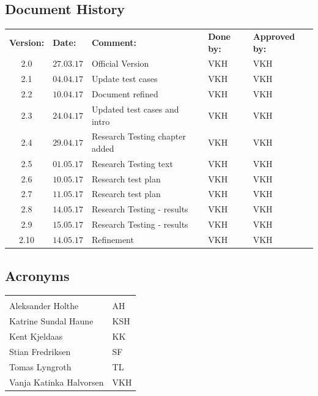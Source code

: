 \documentclass{article}
\begin{document}
\begin{center}
\section*{\textbf{Document History}}
\begin{tabular}{cllll}
\rowcolor{cadetgrey}
\textbf{Version:}    &\textbf{Date:} 	 &\textbf{Comment:}    &\textbf{Done by:}   &\textbf{Approved by:}  \\
2.0    & $27.03.17$    & Official Version & VKH & VKH \\
2.1    & $04.04.17$    & Update test cases & VKH & VKH \\
2.2    & $10.04.17$    & Document refined & VKH & VKH \\
2.3    & $24.04.17$    & Updated test cases and intro & VKH & VKH \\
2.4    & $29.04.17$    & Research Testing chapter added & VKH & VKH \\
2.5    & $01.05.17$    & Research Testing text & VKH & VKH \\
2.6    & $10.05.17$    & Research test plan & VKH & VKH \\
2.7    & $11.05.17$    & Research test plan & VKH & VKH \\
2.8    & $14.05.17$    & Research Testing - results & VKH & VKH \\
2.9    & $15.05.17$    & Research Testing - results & VKH & VKH \\
2.10    & $14.05.17$   & Refinement & VKH & VKH \\
\end{tabular}                                                                   
\end{center}
\vspace*{1 cm}

\begin{center}
\section*{\textbf{Acronyms}}
\begin{tabular}{ll}
\rowcolor{cadetgrey}
    &   \\
Aleksander Holthe      & AH     
 \\\rowcolor{gainsboro}
Katrine Sundal Haune  & KSH \\
Kent Kjeldaas         & KK 
 \\\rowcolor{gainsboro}
Stian Fredriksen      & SF  \\
Tomas Lyngroth       & TL   
 \\\rowcolor{gainsboro}
Vanja Katinka Halvorsen     & VKH   \\
\end{tabular}                                                             
\end{center}
\end{document}
